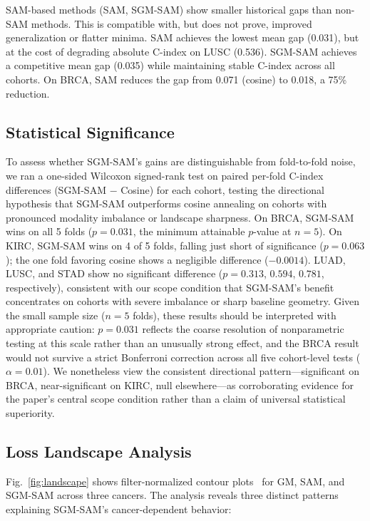 \documentclass[runningheads]{llncs}
\begin{document}
SAM-based methods (SAM, SGM-SAM) show smaller historical
gaps than non-SAM methods. This is compatible with,
but does not prove, improved generalization or flatter minima. SAM achieves the lowest mean gap
(0.031), but at the cost of degrading absolute C-index on LUSC
(0.536). SGM-SAM achieves a competitive mean gap (0.035) while
maintaining stable C-index across all cohorts. On BRCA, SAM reduces
the gap from 0.071 (cosine) to 0.018, a 75\% reduction.

\subsection{Statistical Significance}

To assess whether SGM-SAM's gains are distinguishable from
fold-to-fold noise, we ran a one-sided Wilcoxon signed-rank test on
paired per-fold C-index differences (SGM-SAM $-$ Cosine) for each
cohort, testing the directional hypothesis that SGM-SAM outperforms
cosine annealing on cohorts with pronounced modality imbalance or
landscape sharpness. On BRCA, SGM-SAM wins on all 5 folds
($p=0.031$, the minimum attainable $p$-value at $n\!=\!5$). On KIRC,
SGM-SAM wins on 4 of 5 folds, falling just short of significance
($p=0.063$); the one fold favoring cosine shows a negligible
difference ($-0.0014$). LUAD, LUSC, and STAD show no significant
difference ($p=0.313$, $0.594$, $0.781$, respectively), consistent
with our scope condition that SGM-SAM's benefit concentrates on
cohorts with severe imbalance or sharp baseline geometry. Given the
small sample size ($n\!=\!5$ folds), these results should be
interpreted with appropriate caution: $p=0.031$ reflects the coarse
resolution of nonparametric testing at this scale rather than an
unusually strong effect, and the BRCA result would not survive a
strict Bonferroni correction across all five cohort-level tests
($\alpha=0.01$). We nonetheless view the consistent directional
pattern---significant on BRCA, near-significant on KIRC, null
elsewhere---as corroborating evidence for the paper's central scope
condition rather than a claim of universal statistical superiority.

\subsection{Loss Landscape Analysis}

Fig.~\ref{fig:landscape} shows filter-normalized contour
plots~\cite{li2018visualizing} for GM, SAM, and SGM-SAM across three
cancers. The analysis reveals three distinct patterns explaining
SGM-SAM's cancer-dependent behavior:
\end{document}

